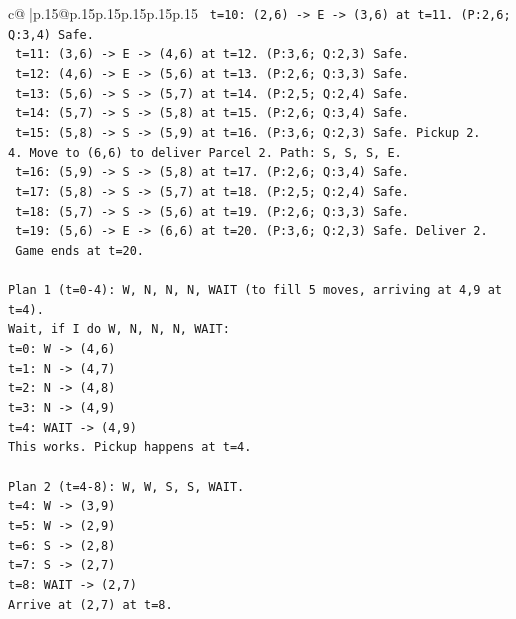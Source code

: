 \documentclass{article}
\begin{document}
{\begin{supertabular}{c@{$\;$}|p{.15\linewidth}@{}p{.15\linewidth}p{.15\linewidth}p{.15\linewidth}p{.15\linewidth}p{.15\linewidth}}
{{{\texttt{   t=10: (2,6) {-}> E {-}> (3,6) at t=11. (P:2,6; Q:3,4) Safe.} \\
\texttt{   t=11: (3,6) {-}> E {-}> (4,6) at t=12. (P:3,6; Q:2,3) Safe.} \\
\texttt{   t=12: (4,6) {-}> E {-}> (5,6) at t=13. (P:2,6; Q:3,3) Safe.} \\
\texttt{   t=13: (5,6) {-}> S {-}> (5,7) at t=14. (P:2,5; Q:2,4) Safe.} \\
\texttt{   t=14: (5,7) {-}> S {-}> (5,8) at t=15. (P:2,6; Q:3,4) Safe.} \\
\texttt{   t=15: (5,8) {-}> S {-}> (5,9) at t=16. (P:3,6; Q:2,3) Safe. Pickup 2.} \\
\texttt{4. Move to (6,6) to deliver Parcel 2. Path: S, S, S, E.} \\
\texttt{   t=16: (5,9) {-}> S {-}> (5,8) at t=17. (P:2,6; Q:3,4) Safe.} \\
\texttt{   t=17: (5,8) {-}> S {-}> (5,7) at t=18. (P:2,5; Q:2,4) Safe.} \\
\texttt{   t=18: (5,7) {-}> S {-}> (5,6) at t=19. (P:2,6; Q:3,3) Safe.} \\
\texttt{   t=19: (5,6) {-}> E {-}> (6,6) at t=20. (P:3,6; Q:2,3) Safe. Deliver 2.} \\
\texttt{   Game ends at t=20.} \\
\\ 
\texttt{Plan 1 (t=0{-}4): W, N, N, N, WAIT (to fill 5 moves, arriving at 4,9 at t=4).} \\
\texttt{Wait, if I do W, N, N, N, WAIT:} \\
\texttt{t=0: W {-}> (4,6)} \\
\texttt{t=1: N {-}> (4,7)} \\
\texttt{t=2: N {-}> (4,8)} \\
\texttt{t=3: N {-}> (4,9)} \\
\texttt{t=4: WAIT {-}> (4,9)} \\
\texttt{This works. Pickup happens at t=4.} \\
\\ 
\texttt{Plan 2 (t=4{-}8): W, W, S, S, WAIT.} \\
\texttt{t=4: W {-}> (3,9)} \\
\texttt{t=5: W {-}> (2,9)} \\
\texttt{t=6: S {-}> (2,8)} \\
\texttt{t=7: S {-}> (2,7)} \\
\texttt{t=8: WAIT {-}> (2,7)} \\
\texttt{Arrive at (2,7) at t=8.} \\
}}}
\end{supertabular}}
\end{document}
